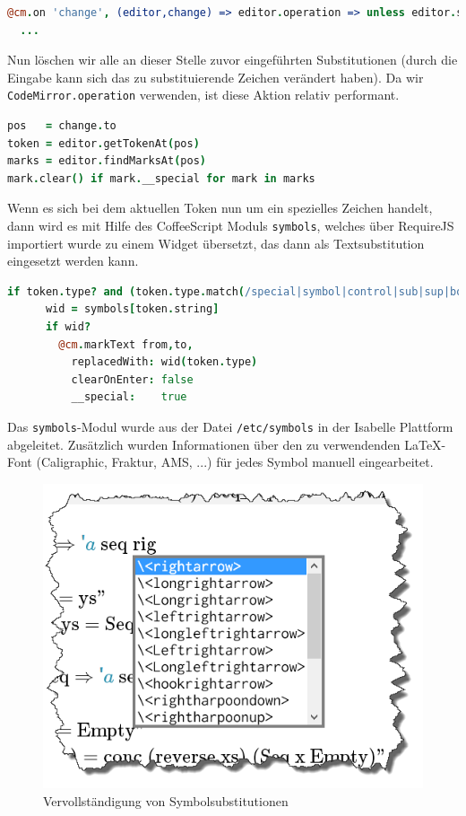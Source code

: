 \begin{lstlisting}[language=coffee]
@cm.on 'change', (editor,change) => editor.operation => unless editor.somethingSelected()
  ...
\end{lstlisting}

Nun löschen wir alle an dieser Stelle zuvor eingeführten Substitutionen (durch die Eingabe kann sich
das zu substituierende Zeichen verändert haben). Da wir \texttt{CodeMirror.operation} verwenden, ist
diese Aktion relativ performant.

\begin{lstlisting}[language=coffee]
pos   = change.to
token = editor.getTokenAt(pos)          
marks = editor.findMarksAt(pos)
mark.clear() if mark.__special for mark in marks 
\end{lstlisting}

Wenn es sich bei dem aktuellen Token nun um ein spezielles Zeichen handelt, dann wird es mit Hilfe
des CoffeeScript Moduls \texttt{symbols}, welches über RequireJS importiert wurde zu einem Widget
übersetzt, das dann als Textsubstitution eingesetzt werden kann.

\begin{lstlisting}[language=coffee]
    if token.type? and (token.type.match(/special|symbol|control|sub|sup|bold/))
      wid = symbols[token.string]
      if wid?
        @cm.markText from,to,          
          replacedWith: wid(token.type)
          clearOnEnter: false
          __special:    true
\end{lstlisting}

Das \texttt{symbols}-Modul wurde aus der Datei \texttt{/etc/symbols} in der Isabelle Plattform
abgeleitet. Zusätzlich wurden Informationen über den zu verwendenden \LaTeX-Font (Caligraphic,
Fraktur, AMS, ...) für jedes Symbol manuell eingearbeitet.

\begin{figure}[ht]
\centering
\includegraphics[width=0.5\linewidth]{images/completion}
  \caption{Vervollständigung von Symbolsubstitutionen}
  \label{fig:subst}
\end{figure}


